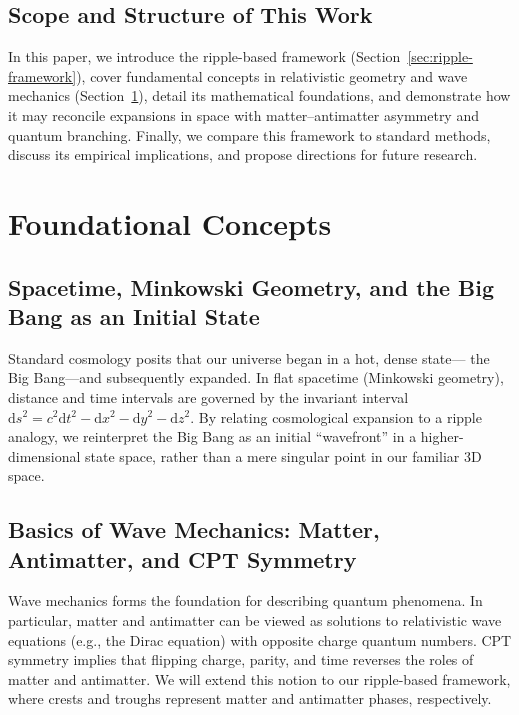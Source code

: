 \documentclass[11pt]{article}
\begin{document}
\subsection{Scope and Structure of This Work}
\label{subsec:scope-structure}
In this paper, we introduce the ripple-based framework (Section~\ref{sec:ripple-framework}), 
cover fundamental concepts in relativistic geometry and wave mechanics 
(Section~\ref{sec:foundational-concepts}), detail its mathematical 
foundations, and demonstrate how it may reconcile expansions in space 
with matter--antimatter asymmetry and quantum branching. 
Finally, we compare this framework to standard methods, discuss its 
empirical implications, and propose directions for future research.


\section{Foundational Concepts}
\label{sec:foundational-concepts}

\subsection{Spacetime, Minkowski Geometry, and the Big Bang as an Initial State}
\label{subsec:spacetime-bigbang}
Standard cosmology posits that our universe began in a hot, dense state---%
the Big Bang---and subsequently expanded. In flat spacetime (Minkowski 
geometry), distance and time intervals are governed by the invariant 
interval $\mathrm{d}s^2 = c^2 \mathrm{d}t^2 - \mathrm{d}x^2 - \mathrm{d}y^2 - \mathrm{d}z^2$. 
By relating cosmological expansion to a ripple analogy, we reinterpret 
the Big Bang as an initial ``wavefront'' in a higher-dimensional state 
space, rather than a mere singular point in our familiar 3D space.

\subsection{Basics of Wave Mechanics: Matter, Antimatter, and CPT Symmetry}
\label{subsec:wave-mechanics}
Wave mechanics forms the foundation for describing quantum phenomena. 
In particular, matter and antimatter can be viewed as solutions to 
relativistic wave equations (e.g., the Dirac equation) with opposite 
charge quantum numbers. CPT symmetry implies that flipping charge, 
parity, and time reverses the roles of matter and antimatter. We will 
extend this notion to our ripple-based framework, where crests and 
troughs represent matter and antimatter phases, respectively.
\end{document}
